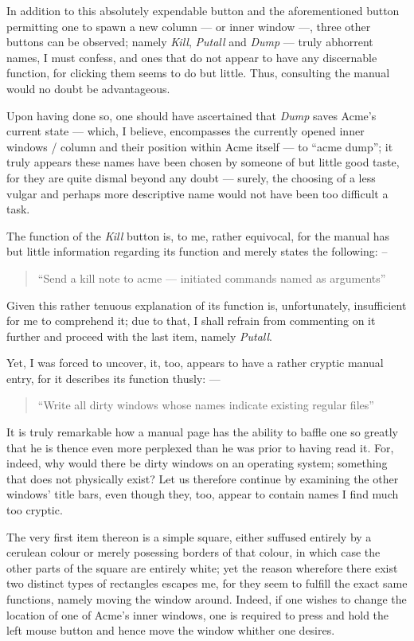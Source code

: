 \documentclass[a5paper,twoside,12pt]{report}
\begin{document}
  In addition to this absolutely expendable button and the aforementioned button permitting one to spawn a new column — or inner window —, three other buttons can be observed; namely \textit{Kill}, \textit{Putall} and \textit{Dump} — truly abhorrent names, I must confess, and ones that do not appear to have any discernable function, for clicking them seems to do but little. Thus, consulting the manual would no doubt be advantageous. 

  Upon having done so, one should have ascertained that \textit{Dump} saves Acme's current state — which, I believe, encompasses the currently opened inner windows / column and their position within Acme itself — to ``acme dump''; it truly appears these names have been chosen by someone of but little good taste, for they are quite dismal beyond any doubt — surely, the choosing of a less vulgar and perhaps more descriptive name would not have been too difficult a task.

  The function of the \textit{Kill} button is, to me, rather equivocal, for the manual has but little information regarding its function and merely states the following: –

  \begin{quote}
    ``Send a kill note to acme — initiated commands named as arguments''
  \end{quote}

  Given this rather tenuous explanation of its function is, unfortunately, insufficient for me to comprehend it; due to that, I shall refrain from commenting on it further and proceed with the last item, namely \textit{Putall}.

  Yet, I was forced to uncover, it, too, appears to have a rather cryptic manual entry, for it describes its function thusly: —

  \begin{quote}
    ``Write all dirty windows whose names indicate existing regular files''
  \end{quote}

  It is truly remarkable how a manual page has the ability to baffle one so greatly that he is thence even more perplexed than he was prior to having read it. For, indeed, why would there be dirty windows on an operating system; something that does not physically exist? Let us therefore continue by examining the other windows' title bars, even though they, too, appear to contain names I find much too cryptic.

  The very first item thereon is a simple square, either suffused entirely by a cerulean colour or merely posessing borders of that colour, in which case the other parts of the square are entirely white; yet the reason wherefore there exist two distinct types of rectangles escapes me, for they seem to fulfill the exact same functions, namely moving the window around. Indeed, if one wishes to change the location of one of Acme's inner windows, one is required to press and hold the left mouse button and hence move the window whither one desires. 
\end{document}
